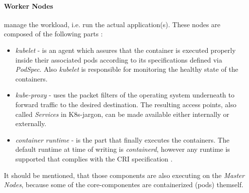 \documentclass[MIC,Master,english]{twbook}%
\begin{document}
\paragraph{Worker Nodes} manage the workload, i.e. run the actual application(s). These nodes are composed of the following parts \cite{k8scomp}: 
\begin{itemize}
    \item \textit{kubelet} - is an agent which assures that the container is executed properly inside their associated pods according to its specifications defined via \textit{PodSpec}. Also \textit{kubelet} is responsible for monitoring the healthy state of the containers.
    \item \textit{kube-proxy} - uses the packet filters of the operating system underneath to forward traffic to the desired destination. The resulting access points, also called \textit{Services} in \ac{K8s}-jargon, can be made available either internally or externally.
    \item \textit{container runtime} - is the part that finally executes the containers. The default runtime at time of writing is \textit{containerd}, however any runtime is supported that complies with the CRI specification \cite{cri-runtime}.
\end{itemize}
It should be mentioned, that those components are also executing on the \textit{Master Nodes}, because some of the core-componentes are containerized (pods) themself.
\end{document}
